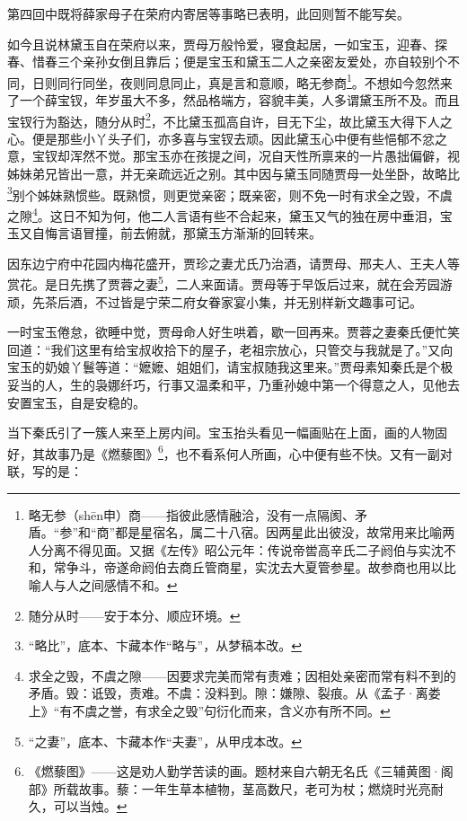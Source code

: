 \par 第四回中既将薛家母子在荣府内寄居等事略已表明，此回则暂不能写矣。
\par 如今且说林黛玉自在荣府以来，贾母万般怜爱，寝食起居，一如宝玉，迎春、探春、惜春三个亲孙女倒且靠后；便是宝玉和黛玉二人之亲密友爱处，亦自较别个不同，日则同行同坐，夜则同息同止，真是言和意顺，略无参商\footnote{略无参（shēn申）商——指彼此感情融洽，没有一点隔阂、矛盾。“参”和“商”都是星宿名，属二十八宿。因两星此出彼没，故常用来比喻两人分离不得见面。又据《左传》昭公元年：传说帝喾高辛氏二子阏伯与实沈不和，常争斗，帝遂命阏伯去商丘管商星，实沈去大夏管参星。故参商也用以比喻人与人之间感情不和。}。不想如今忽然来了一个薛宝钗，年岁虽大不多，然品格端方，容貌丰美，人多谓黛玉所不及。而且宝钗行为豁达，随分从时\footnote{随分从时——安于本分、顺应环境。}，不比黛玉孤高自许，目无下尘，故比黛玉大得下人之心。便是那些小丫头子们，亦多喜与宝钗去顽。因此黛玉心中便有些悒郁不忿之意，宝钗却浑然不觉。那宝玉亦在孩提之间，况自天性所禀来的一片愚拙偏僻，视姊妹弟兄皆出一意，并无亲疏远近之别。其中因与黛玉同随贾母一处坐卧，故略比\footnote{“略比”，底本、卞藏本作“略与”，从梦稿本改。}别个姊妹熟惯些。既熟惯，则更觉亲密；既亲密，则不免一时有求全之毁，不虞之隙\footnote{求全之毁，不虞之隙——因要求完美而常有责难；因相处亲密而常有料不到的矛盾。毁：诋毁，责难。不虞：没料到。隙：嫌隙、裂痕。从《孟子·离娄上》“有不虞之誉，有求全之毁”句衍化而来，含义亦有所不同。}。这日不知为何，他二人言语有些不合起来，黛玉又气的独在房中垂泪，宝玉又自悔言语冒撞，前去俯就，那黛玉方渐渐的回转来。
\par 因东边宁府中花园内梅花盛开，贾珍之妻尤氏乃治酒，请贾母、邢夫人、王夫人等赏花。是日先携了贾蓉之妻\footnote{“之妻”，底本、卞藏本作“夫妻”，从甲戌本改。}，二人来面请。贾母等于早饭后过来，就在会芳园游顽，先茶后酒，不过皆是宁荣二府女眷家宴小集，并无别样新文趣事可记。
\par 一时宝玉倦怠，欲睡中觉，贾母命人好生哄着，歇一回再来。贾蓉之妻秦氏便忙笑回道：“我们这里有给宝叔收拾下的屋子，老祖宗放心，只管交与我就是了。”又向宝玉的奶娘丫鬟等道：“嬷嬷、姐姐们，请宝叔随我这里来。”贾母素知秦氏是个极妥当的人，生的袅娜纤巧，行事又温柔和平，乃重孙媳中第一个得意之人，见他去安置宝玉，自是安稳的。
\par 当下秦氏引了一簇人来至上房内间。宝玉抬头看见一幅画贴在上面，画的人物固好，其故事乃是《燃藜图》\footnote{《燃藜图》——这是劝人勤学苦读的画。题材来自六朝无名氏《三辅黄图·阁部》所载故事。藜：一年生草本植物，茎高数尺，老可为杖；燃烧时光亮耐久，可以当烛。}，也不看系何人所画，心中便有些不快。又有一副对联，写的是：
